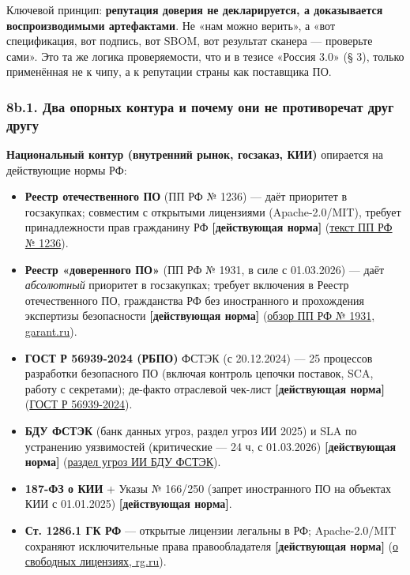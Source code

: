 \documentclass[
  russian,
]{article}
\providecommand{\tightlist}{%
  \setlength{\itemsep}{0pt}\setlength{\parskip}{0pt}}
\begin{document}
Ключевой принцип: \textbf{репутация доверия не декларируется, а
доказывается воспроизводимыми артефактами}. Не «нам можно верить», а
«вот спецификация, вот подпись, вот SBOM, вот результат сканера ---
проверьте сами». Это та же логика проверяемости, что и в тезисе «Россия
3.0» (§ 3), только применённая не к чипу, а к репутации страны как
поставщика ПО.

\subsubsection{8b.1. Два опорных контура и почему они не противоречат
друг
другу}\label{b.1.-ux434ux432ux430-ux43eux43fux43eux440ux43dux44bux445-ux43aux43eux43dux442ux443ux440ux430-ux438-ux43fux43eux447ux435ux43cux443-ux43eux43dux438-ux43dux435-ux43fux440ux43eux442ux438ux432ux43eux440ux435ux447ux430ux442-ux434ux440ux443ux433-ux434ux440ux443ux433ux443}

\textbf{Национальный контур (внутренний рынок, госзаказ, КИИ)} опирается
на действующие нормы РФ:

\begin{itemize}
\tightlist
\item
  \textbf{Реестр отечественного ПО} (ПП РФ № 1236) --- даёт приоритет в
  госзакупках; совместим с открытыми лицензиями (Apache-2.0/MIT),
  требует принадлежности прав гражданину РФ \textbf{{[}действующая
  норма{]}}
  (\href{https://meganorm.ru/Data2/1/4293758/4293758403.htm}{текст ПП РФ
  № 1236}).
\item
  \textbf{Реестр «доверенного ПО»} (ПП РФ № 1931, в силе с 01.03.2026)
  --- даёт \emph{абсолютный} приоритет в госзакупках; требует включения
  в Реестр отечественного ПО, гражданства РФ без иностранного и
  прохождения экспертизы безопасности \textbf{{[}действующая норма{]}}
  (\href{https://www.garant.ru/products/ipo/prime/doc/413066759/}{обзор
  ПП РФ № 1931, garant.ru}).
\item
  \textbf{ГОСТ Р 56939-2024 (РБПО)} ФСТЭК (с 20.12.2024) --- 25
  процессов разработки безопасного ПО (включая контроль цепочки
  поставок, SCA, работу с секретами); де-факто отраслевой чек-лист
  \textbf{{[}действующая норма{]}}
  (\href{https://docs.cntd.ru/document/1310017763/titles/6520IM}{ГОСТ Р
  56939-2024}).
\item
  \textbf{БДУ ФСТЭК} (банк данных угроз, раздел угроз ИИ 2025) и SLA по
  устранению уязвимостей (критические --- 24 ч, с 01.03.2026)
  \textbf{{[}действующая норма{]}}
  (\href{https://bdu.fstec.ru/threat/ai}{раздел угроз ИИ БДУ ФСТЭК}).
\item
  \textbf{187-ФЗ о КИИ} + Указы № 166/250 (запрет иностранного ПО на
  объектах КИИ с 01.01.2025) \textbf{{[}действующая норма{]}}.
\item
  \textbf{Ст. 1286.1 ГК РФ} --- открытые лицензии легальны в РФ;
  Apache-2.0/MIT сохраняют исключительные права правообладателя
  \textbf{{[}действующая норма{]}}
  (\href{https://rg.ru/2022/07/22/ob-ispolzovanii-svobodnyh-i-otkrytyh-licenzij-na-po.html}{о
  свободных лицензиях, rg.ru}).
\end{itemize}
\end{document}
